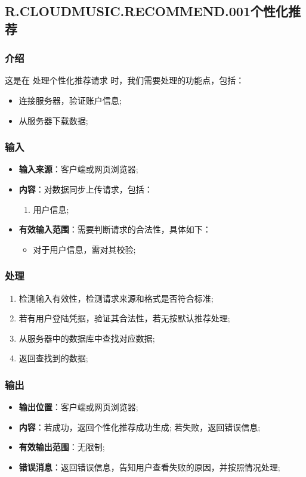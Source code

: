 \subsection{R.CLOUDMUSIC.RECOMMEND.001个性化推荐}
\subsubsection{介绍}
	这是在 处理个性化推荐请求 时，我们需要处理的功能点，包括：
	\begin{itemize}
		\item 连接服务器，验证账户信息;
		\item 从服务器下载数据;
	\end{itemize}
\subsubsection{输入}
	\begin{itemize}
		\item \textbf{输入来源}：客户端或网页浏览器;
		\item \textbf{内容}：对数据同步上传请求，包括：
		\begin{enumerate}
			\item 用户信息;
		\end{enumerate}
		\item \textbf{有效输入范围}：需要判断请求的合法性，具体如下：
		\begin{itemize}
			\item 对于用户信息，需对其校验; 
		\end{itemize}
	\end{itemize}
\subsubsection{处理}
	\begin{enumerate}
		\item 检测输入有效性，检测请求来源和格式是否符合标准;
		\item 若有用户登陆凭据，验证其合法性，若无按默认推荐处理;
		\item 从服务器中的数据库中查找对应数据;
		\item 返回查找到的数据;
	\end{enumerate}
\subsubsection{输出}
\begin{itemize}
	\item \textbf{输出位置}：客户端或网页浏览器;
	\item \textbf{内容}：若成功，返回个性化推荐成功生成; 若失败，返回错误信息;
	\item \textbf{有效输出范围}：无限制;
	\item \textbf{错误消息}：返回错误信息，告知用户查看失败的原因，并按照情况处理;
\end{itemize}

